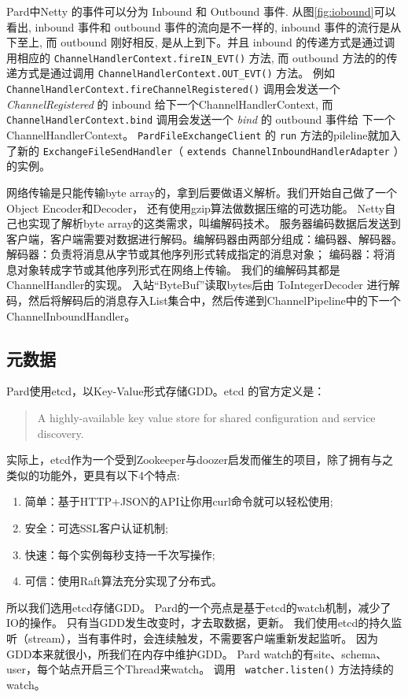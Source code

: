 \documentclass[a4paper, 12pt]{ctexart}
\begin{document}
Pard中Netty 的事件可以分为 Inbound 和 Outbound 事件.
从图\ref{fig:iobound}可以看出, inbound 事件和 outbound 事件的流向是不一样的, inbound 事件的流行是从下至上, 而 outbound 刚好相反, 是从上到下。并且 inbound 的传递方式是通过调用相应的 \lstinline|ChannelHandlerContext.fireIN_EVT()| 方法, 而 outbound 方法的的传递方式是通过调用 \lstinline|ChannelHandlerContext.OUT_EVT()| 方法。 例如 \lstinline|ChannelHandlerContext.fireChannelRegistered()| 调用会发送一个 \textit{ChannelRegistered} 的 inbound 给下一个ChannelHandlerContext, 而 \lstinline|ChannelHandlerContext.bind| 调用会发送一个 \textit{bind} 的 outbound 事件给 下一个 ChannelHandlerContext。
\lstinline|PardFileExchangeClient| 的 \lstinline|run| 方法的pileline就加入了新的
\lstinline|ExchangeFileSendHandler|（ \lstinline|extends ChannelInboundHandlerAdapter| ）的实例。

网络传输是只能传输byte array的，拿到后要做语义解析。我们开始自己做了一个Object Encoder和Decoder，
还有使用gzip算法做数据压缩的可选功能。
Netty自己也实现了解析byte array的这类需求，叫编解码技术。
服务器编码数据后发送到客户端，客户端需要对数据进行解码。编解码器由两部分组成：编码器、解码器。 
解码器：负责将消息从字节或其他序列形式转成指定的消息对象； 
编码器：将消息对象转成字节或其他序列形式在网络上传输。 
我们的编解码其都是ChannelHandler的实现。 
入站“ByteBuf”读取bytes后由 ToIntegerDecoder 进行解码，然后将解码后的消息存入List集合中，然后传递到ChannelPipeline中的下一个ChannelInboundHandler。





\subsection{元数据}
Pard使用etcd，以Key-Value形式存储GDD。etcd  的官方定义是：
\begin{quote}
	A highly-available key value store for shared configuration and service discovery.
\end{quote}
实际上，etcd作为一个受到Zookeeper与doozer启发而催生的项目，除了拥有与之类似的功能外，更具有以下4个特点:
\begin{enumerate}
	\item 简单：基于HTTP+JSON的API让你用curl命令就可以轻松使用;
	\item 安全：可选SSL客户认证机制;
	\item 快速：每个实例每秒支持一千次写操作;
	\item 可信：使用Raft算法充分实现了分布式。
\end{enumerate}
所以我们选用etcd存储GDD。
Pard的一个亮点是基于etcd的watch机制，减少了IO的操作。
只有当GDD发生改变时，才去取数据，更新。
我们使用etcd的持久监听（stream），当有事件时，会连续触发，不需要客户端重新发起监听。
因为GDD本来就很小，所我们在内存中维护GDD。
Pard watch的有site、schema、user，每个站点开启三个Thread来watch。
调用 \lstinline| watcher.listen()| 方法持续的watch。
\end{document}
